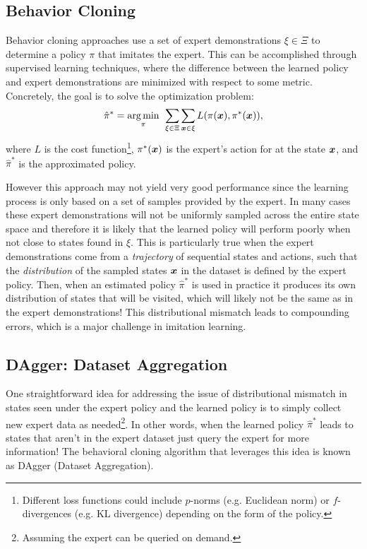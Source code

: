 \subsection{Behavior Cloning}
Behavior cloning approaches use a set of expert demonstrations $\xi \in \Xi$ to determine a policy $\pi$ that imitates the expert. This can be accomplished through supervised learning techniques, where the difference between the learned policy and expert demonstrations are minimized with respect to some metric. Concretely, the goal is to solve the optimization problem:
\begin{equation*}
\hat{\pi}^* = \underset{\pi}{\arg\min} \:\:  \sum_{\xi \in \Xi}\sum_{\bm{x} \in \xi} L(\pi(\bm{x}), \pi^*(\bm{x})),
\end{equation*}
where $L$ is the cost function\footnote{Different loss functions could include $p$-norms (e.g. Euclidean norm) or $f$-divergences (e.g. KL divergence) depending on the form of the policy.}, $\pi^*(\bm{x})$ is the expert's action for at the state $\bm{x}$, and $\hat{\pi}^*$ is the approximated policy.

However this approach may not yield very good performance since the learning process is only based on a set of samples provided by the expert. In many cases these expert demonstrations will not be uniformly sampled across the entire state space and therefore it is likely that the learned policy will perform poorly when not close to states found in $\xi$. This is particularly true when the expert demonstrations come from a \textit{trajectory} of sequential states and actions, such that the \textit{distribution} of the sampled states $\bm{x}$ in the dataset is defined by the expert policy. Then, when an estimated policy $\hat{\pi}^*$ is used in practice it produces its own distribution of states that will be visited, which will likely not be the same as in the expert demonstrations! This distributional mismatch leads to compounding errors, which is a major challenge in imitation learning.

\subsection{DAgger: Dataset Aggregation}
One straightforward idea for addressing the issue of distributional mismatch in states seen under the expert policy and the learned policy is to simply collect new expert data as needed\footnote{Assuming the expert can be queried on demand.}. In other words, when the learned policy $\hat{\pi}^*$ leads to states that aren't in the expert dataset just query the expert for more information! The behavioral cloning algorithm that leverages this idea is known as DAgger\cite{RossGordonEtAl2011} (Dataset Aggregation).

